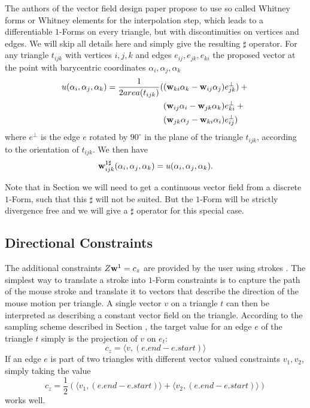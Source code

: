The authors of the vector field design paper  propose to use so called Whitney forms or Whitney elements for the interpolation step, which leads to a differentiable $1$-Forms on every triangle, but with discontinuities on vertices and edges. We will skip all details here and simply give the resulting $\sharp$ operator. For any triangle $t_{ijk}$ with vertices $i,j,k$ and edges $e_{ij}, e_{jk},e_{ki}$ the proposed vector at the point with barycentric coordinates $\alpha_i, \alpha_j, \alpha_k$
\begin{align} u(\alpha_i, \alpha_j, \alpha_k) = \frac{1}{2area(t_{ijk})} ( &(\textbf{w}_{ki} \alpha_k - \textbf{w}_{ij} \alpha_j)e_{jk}^\perp ) + {}\nonumber\\
&(\textbf{w}_{ij} \alpha_i - \textbf{w}_{jk} \alpha_k)e_{ki}^\perp + {}\nonumber\\ 
&(\textbf{w}_{jk} \alpha_j - \textbf{w}_{ki} \alpha_i)e_{ij}^\perp)
\label{eq:vfSharp}
\end{align}
where $e^\perp$ is the edge $e$ rotated by $90^\circ$ in the plane of the triangle $t_{ijk}$, according to the orientation of $t_{ijk}$. We then have
$$\textbf{w}^{1\sharp}_{ijk}(\alpha_i, \alpha_j, \alpha_k) = u(\alpha_i, \alpha_j, \alpha_k).$$

Note that in Section  we will need to get a continuous vector field from a discrete $1$-Form, such that this $\sharp$ will not be suited. But the $1$-Form will be strictly divergence free and we will give a $\sharp$ operator for this special case.


\subsection{Directional Constraints}
The additional constraints $Z \textbf{w}^1 = c_z$ are provided by the user using strokes . The simplest way to translate a stroke into $1$-Form constraints is to capture the path of the mouse stroke and translate it to vectors that describe the direction of the mouse motion per triangle.
A single vector $v$ on a triangle $t$ can then be interpreted as describing a constant vector field on the triangle. According to the sampling scheme described in Section , the target value for an edge $e$ of the triangle $t$ simply is the projection of $v$ on $e_t$:
$$c_z = \langle v, (e.end - e.start) \rangle$$
If an edge $e$ is part of two triangles with different vector valued constraints $v_1,v_2$, simply taking the value
\[c_z= \frac{1}{2}\left(\langle v_1, (e.end - e.start) \rangle + \langle v_2, (e.end - e.start) \rangle\right)\]
works well.

